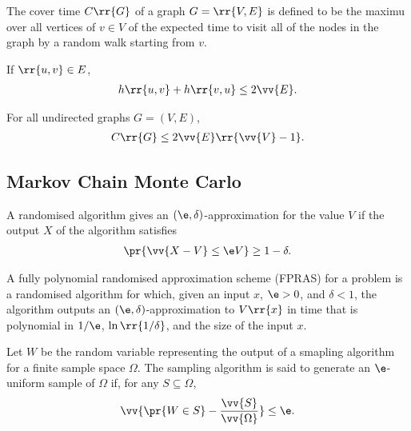 \documentclass{article}
\begin{document}
\begin{definition}
  The cover time $C\rr{G}$ of a graph $G=\rr{V,E}$ is defined to be the maximu over all
  vertices of $v\in V$ of the expected time to visit all of the nodes in the graph by a
  random walk starting from $v$.
\end{definition}

\begin{lemma}
  If $\rr{u,v}\in E$,
  \begin{align*}
    h\rr{u,v}+h\rr{v,u}\leq 2\vv{E}.
  \end{align*}
\end{lemma}

\begin{lemma}
  For all undirected graphs $G=(V,E)$,
  \begin{align*}
    C\rr{G}\leq 2\vv{E}\rr{\vv{V}-1}.
  \end{align*}
\end{lemma}

\subsection{Markov Chain Monte Carlo}

\begin{definition}
  A randomised algorithm gives an $(\e,\delta)$-approximation for the value $V$
  if the output $X$ of the algorithm satisfies
  \begin{align*}
    \pr{\vv{X-V}\leq\e V} \geq 1-\delta.
  \end{align*}
\end{definition}

\begin{definition}
  A fully polynomial randomised approximation scheme (FPRAS) for a problem
  is a randomised algorithm for which, given an input $x$, $\e>0$, and $\delta < 1$,
  the algorithm outputs an $(\e,\delta)$-approximation to $V\rr{x}$ in time
  that is polynomial in $1/\e$, $\ln\rr{1/\delta}$, and the size of the input $x$.
\end{definition}

\begin{definition}
  Let $W$ be the random variable representing the output of a smapling algorithm for a
  finite sample space $\Omega$. The sampling algorithm is said to generate an $\e$-uniform
  sample of $\Omega$ if, for any $S\subseteq\Omega$,
  \begin{align*}
    \vv{\pr{W\in S}-\frac{\vv{S}}{\vv{\Omega}}}\leq\e.
  \end{align*}
\end{definition}
\end{document}
